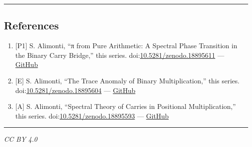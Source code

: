 \documentclass[
  11pt,
]{article}
\providecommand{\tightlist}{%
  \setlength{\itemsep}{0pt}\setlength{\parskip}{0pt}}
\begin{document}
\begin{center}\rule{0.5\linewidth}{0.5pt}\end{center}

\newpage

\subsection{References}\label{references}

\begin{enumerate}
\def\labelenumi{\arabic{enumi}.}
\tightlist
\item
  {[}P1{]} S. Alimonti, ``π from Pure Arithmetic: A Spectral Phase Transition in
  the Binary Carry Bridge,'' this series.
  doi:\href{https://doi.org/10.5281/zenodo.18895611}{10.5281/zenodo.18895611}
  ---
  \href{https://github.com/stefanoalimonti/carry-arithmetic-P1-pi-spectral}{GitHub}
\item
  {[}E{]} S. Alimonti, ``The Trace Anomaly of Binary Multiplication,'' this
  series.
  doi:\href{https://doi.org/10.5281/zenodo.18895604}{10.5281/zenodo.18895604}
  ---
  \href{https://github.com/stefanoalimonti/carry-arithmetic-E-trace-anomaly}{GitHub}
\item
  {[}A{]} S. Alimonti, ``Spectral Theory of Carries in Positional
  Multiplication,'' this series.
  doi:\href{https://doi.org/10.5281/zenodo.18895593}{10.5281/zenodo.18895593}
  ---
  \href{https://github.com/stefanoalimonti/carry-arithmetic-A-spectral-theory}{GitHub}
\end{enumerate}

\begin{center}\rule{0.5\linewidth}{0.5pt}\end{center}

\emph{CC BY 4.0}
\end{document}
